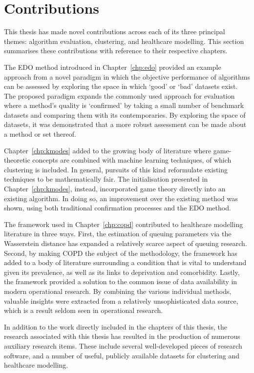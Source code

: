 \section{Contributions}\label{sec:contributions}

This thesis has made novel contributions across each of its three principal
themes: algorithm evaluation, clustering, and healthcare modelling. This section
summarises these contributions with reference to their respective chapters.

The EDO method introduced in Chapter~\ref{chp:edo} provided an example approach
from a novel paradigm in which the objective performance of algorithms can be
assessed by exploring the space in which `good' or `bad' datasets exist. The
proposed paradigm expands the commonly used approach for evaluation where a
method's quality is `confirmed' by taking a small number of benchmark datasets
and comparing them with its contemporaries. By exploring the space of datasets,
it was demonstrated that a more robust assessment can be made about a method or
set thereof.

Chapter~\ref{chp:kmodes} added to the growing body of literature where
game-theoretic concepts are combined with machine learning techniques, of which
clustering is included. In general, pursuits of this kind reformulate existing
techniques to be mathematically fair. The initialisation presented in
Chapter~\ref{chp:kmodes}, instead, incorporated game theory directly into an
existing algorithm. In doing so, an improvement over the existing method was
shown, using both traditional confirmation processes and the EDO method.

The framework used in Chapter~\ref{chp:copd} contributed to healthcare modelling
literature in three ways. First, the estimation of queuing parameters via the
Wasserstein distance has expanded a relatively scarce aspect of queuing
research. Second, by making COPD the subject of the methodology, the framework
has added to a body of literature surrounding a condition that is vital to
understand given its prevalence, as well as its links to deprivation and
comorbidity. Lastly, the framework provided a solution to the common issue of
data availability in modern operational research. By combining the various
individual methods, valuable insights were extracted from a relatively
unsophisticated data source, which is a result seldom seen in operational
research.

In addition to the work directly included in the chapters of this thesis, the
research associated with this thesis has resulted in the production of numerous
auxiliary research items. These include several well-developed pieces of
research software, and a number of useful, publicly available datasets for
clustering and healthcare modelling.


